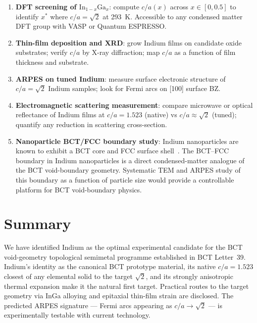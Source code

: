 \documentclass[aps,prl,twocolumn,superscriptaddress,floatfix]{revtex4-2}
\begin{document}
\begin{enumerate}
  \item \textbf{DFT screening of $\mathrm{In}_{1-x}\mathrm{Ga}_x$}:
        compute $c/a(x)$ across $x \in [0, 0.5]$ to identify $x^*$
        where $c/a = \sqrt{2}$ at 293~K. Accessible to any condensed
        matter DFT group with VASP or Quantum ESPRESSO.

  \item \textbf{Thin-film deposition and XRD}:
        grow Indium films on candidate oxide substrates; verify
        $c/a$ by X-ray diffraction; map $c/a$ as a function of
        film thickness and substrate.

  \item \textbf{ARPES on tuned Indium}:
        measure surface electronic structure of $c/a = \sqrt{2}$
        Indium samples; look for Fermi arcs on [100] surface BZ.

  \item \textbf{Electromagnetic scattering measurement}:
        compare microwave or optical reflectance of Indium films
        at $c/a = 1.523$ (native) vs $c/a \approx \sqrt{2}$ (tuned);
        quantify any reduction in scattering cross-section.

  \item \textbf{Nanoparticle BCT/FCC boundary study}:
        Indium nanoparticles are known to exhibit a BCT core and FCC
        surface shell~\cite{crystal_structure_indium}.
        The BCT--FCC boundary in Indium nanoparticles is a direct
        condensed-matter analogue of the BCT void-boundary geometry.
        Systematic TEM and ARPES study of this boundary as a function
        of particle size would provide a controllable platform for
        BCT void-boundary physics.
\end{enumerate}

\section{Summary}

We have identified Indium as the optimal experimental candidate for
the BCT void-geometry topological semimetal programme established in
BCT Letter~39.
Indium's identity as the canonical BCT prototype material, its native
$c/a = 1.523$ closest of any elemental solid to the target $\sqrt{2}$,
and its strongly anisotropic thermal expansion make it the natural
first target.
Practical routes to the target geometry via InGa alloying and
epitaxial thin-film strain are disclosed.
The predicted ARPES signature --- Fermi arcs appearing as $c/a \to
\sqrt{2}$ --- is experimentally testable with current technology.
\end{document}
